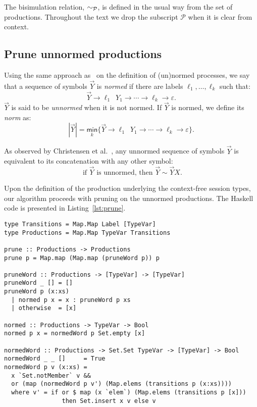 The bisimulation relation, $\sim_{\mathcal{P}}$, is defined in the usual way from the 
set of productions. Throughout the text we drop the subscript $\mathcal{P}$ when 
it is clear from context.

\subsection{Prune unnormed productions}
\label{subsec:prune}

Using the same approach as~\cite{DBLP:journals/iandc/ChristensenHS95} on 
the definition of (un)normed processes, we say that a sequence of symbols 
$\vec Y$ is \emph{normed} if there are labels $\ell_1,\ldots, \ell_k$ 
such that:
\[\vec Y \rightarrow \ell_1\enspace Y_1 \rightarrow \cdots \rightarrow \ell_k 
\rightarrow \varepsilon.\]
$\vec Y$ is said to be \emph{unnormed} when it is not normed. If $\vec Y$ 
is normed, we define its \emph{norm} as: 
\[ | \vec Y | = \underset{k}{\mathsf{min}} \{\vec Y \rightarrow \ell_1\enspace Y_1 
\rightarrow \cdots \rightarrow \ell_k \rightarrow \varepsilon \}.\]

As observed by Christensen et al.~\cite{DBLP:journals/iandc/ChristensenHS95}, 
any unnormed sequence of symbols $\vec Y$ is equivalent to its concatenation 
with any other symbol:
\[ \text{ if } \vec Y \text{ is unnormed, then } \vec Y \sim \vec Y X.\]

Upon the definition of the production underlying the context-free session types,
our algorithm proceeds with pruning on the unnormed productions. The Haskell code 
is presented in Listing~\ref{lst:prune}.

\begin{lstlisting}[caption={Haskell code for the stage of pruning unnormed productions},label={lst:prune},captionpos=b]
type Transitions = Map.Map Label [TypeVar]
type Productions = Map.Map TypeVar Transitions

prune :: Productions -> Productions
prune p = Map.map (Map.map (pruneWord p)) p

pruneWord :: Productions -> [TypeVar] -> [TypeVar]
pruneWord _ [] = []
pruneWord p (x:xs)
  | normed p x = x : pruneWord p xs
  | otherwise  = [x]

normed :: Productions -> TypeVar -> Bool
normed p x = normedWord p Set.empty [x]

normedWord :: Productions -> Set.Set TypeVar -> [TypeVar] -> Bool
normedWord _ _ []     = True
normedWord p v (x:xs) =
  x `Set.notMember` v &&
  or (map (normedWord p v') (Map.elems (transitions p (x:xs))))
  where v' = if or $ map (x `elem`) (Map.elems (transitions p [x])) 
                then Set.insert x v else v
\end{lstlisting}

